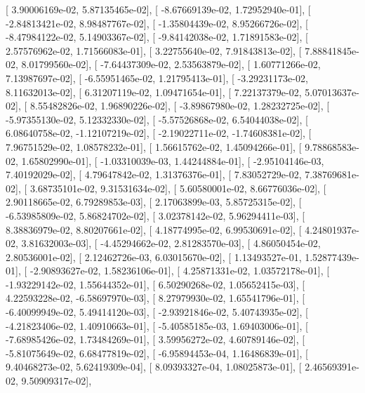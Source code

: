 \documentclass{article}
\begin{document}
       [  3.90006169e-02,   5.87135465e-02],
       [ -8.67669139e-02,   1.72952940e-01],
       [ -2.84813421e-02,   8.98487767e-02],
       [ -1.35804439e-02,   8.95266726e-02],
       [ -8.47984122e-02,   5.14903367e-02],
       [ -9.84142038e-02,   1.71891583e-02],
       [  2.57576962e-02,   1.71566083e-01],
       [  3.22755640e-02,   7.91843813e-02],
       [  7.88841845e-02,   8.01799560e-02],
       [ -7.64437309e-02,   2.53563879e-02],
       [  1.60771266e-02,   7.13987697e-02],
       [ -6.55951465e-02,   1.21795413e-01],
       [ -3.29231173e-02,   8.11632013e-02],
       [  6.31207119e-02,   1.09471654e-01],
       [  7.22137379e-02,   5.07013637e-02],
       [  8.55482826e-02,   1.96890226e-02],
       [ -3.89867980e-02,   1.28232725e-02],
       [ -5.97355130e-02,   5.12332330e-02],
       [ -5.57526868e-02,   6.54044038e-02],
       [  6.08640758e-02,  -1.12107219e-02],
       [ -2.19022711e-02,  -1.74608381e-02],
       [  7.96751529e-02,   1.08578232e-01],
       [  1.56615762e-02,   1.45094266e-01],
       [  9.78868583e-02,   1.65802990e-01],
       [ -1.03310039e-03,   1.44244884e-01],
       [ -2.95104146e-03,   7.40192029e-02],
       [  4.79647842e-02,   1.31376376e-01],
       [  7.83052729e-02,   7.38769681e-02],
       [  3.68735101e-02,   9.31531634e-02],
       [  5.60580001e-02,   8.66776036e-02],
       [  2.90118665e-02,   6.79289853e-03],
       [  2.17063899e-03,   5.85725315e-02],
       [ -6.53985809e-02,   5.86824702e-02],
       [  3.02378142e-02,   5.96294411e-03],
       [  8.38836979e-02,   8.80207661e-02],
       [  4.18774995e-02,   6.99530691e-02],
       [  4.24801937e-02,   3.81632003e-03],
       [ -4.45294662e-02,   2.81283570e-03],
       [  4.86050454e-02,   2.80536001e-02],
       [  2.12462726e-03,   6.03015670e-02],
       [  1.13493527e-01,   1.52877439e-01],
       [ -2.90893627e-02,   1.58236106e-01],
       [  4.25871331e-02,   1.03572178e-01],
       [ -1.93229142e-02,   1.55644352e-01],
       [  6.50290268e-02,   1.05652415e-03],
       [  4.22593228e-02,  -6.58697970e-03],
       [  8.27979930e-02,   1.65541796e-01],
       [ -6.40099949e-02,   5.49414120e-03],
       [ -2.93921846e-02,   5.40743935e-02],
       [ -4.21823406e-02,   1.40910663e-01],
       [ -5.40585185e-03,   1.69403006e-01],
       [ -7.68985426e-02,   1.73484269e-01],
       [  3.59956272e-02,   4.60789146e-02],
       [ -5.81075649e-02,   6.68477819e-02],
       [ -6.95894453e-04,   1.16486839e-01],
       [  9.40468273e-02,   5.62419309e-04],
       [  8.09393327e-04,   1.08025873e-01],
       [  2.46569391e-02,   9.50909317e-02],
\end{document}
